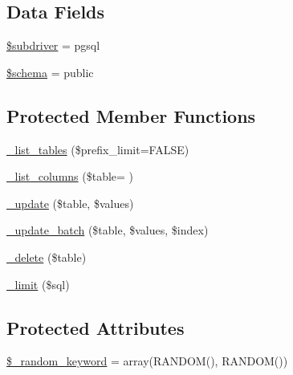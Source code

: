 \subsection*{Data Fields}
\begin{DoxyCompactItemize}
\item 
\hyperlink{class_c_i___d_b__pdo__pgsql__driver_a1322ca756348b11d080cb7a4f590de15}{\$subdriver} = \textquotesingle{}pgsql\textquotesingle{}
\item 
\hyperlink{class_c_i___d_b__pdo__pgsql__driver_a83022b1d70799d2bde3d64dca9cb40ee}{\$schema} = \textquotesingle{}public\textquotesingle{}
\end{DoxyCompactItemize}
\subsection*{Protected Member Functions}
\begin{DoxyCompactItemize}
\item 
\hyperlink{class_c_i___d_b__pdo__pgsql__driver_a435c0f3ce54fe7daa178baa8532ebd54}{\+\_\+list\+\_\+tables} (\$prefix\+\_\+limit=F\+A\+L\+S\+E)
\item 
\hyperlink{class_c_i___d_b__pdo__pgsql__driver_a2a81bb476a5c76fe6f763b0557c1e4c2}{\+\_\+list\+\_\+columns} (\$table= \textquotesingle{}\textquotesingle{})
\item 
\hyperlink{class_c_i___d_b__pdo__pgsql__driver_a2540b03a93fa73ae74c10d0e16fc073e}{\+\_\+update} (\$table, \$values)
\item 
\hyperlink{class_c_i___d_b__pdo__pgsql__driver_a336b9ebb119e47b6a84bb7fc9d4dae93}{\+\_\+update\+\_\+batch} (\$table, \$values, \$index)
\item 
\hyperlink{class_c_i___d_b__pdo__pgsql__driver_a133ea8446ded52589bd22cc9163d0896}{\+\_\+delete} (\$table)
\item 
\hyperlink{class_c_i___d_b__pdo__pgsql__driver_a3a02ea06541b8ecc25a33a61651562c8}{\+\_\+limit} (\$sql)
\end{DoxyCompactItemize}
\subsection*{Protected Attributes}
\begin{DoxyCompactItemize}
\item 
\hyperlink{class_c_i___d_b__pdo__pgsql__driver_a10213aa6e05f6d924d3277bb1d2fea00}{\$\+\_\+random\+\_\+keyword} = array(\textquotesingle{}R\+A\+N\+D\+O\+M()\textquotesingle{}, \textquotesingle{}R\+A\+N\+D\+O\+M()\textquotesingle{})
\end{DoxyCompactItemize}


